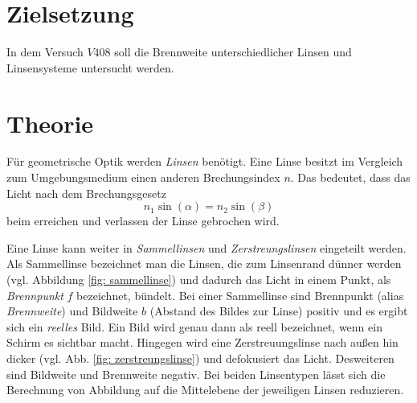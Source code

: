 \setcounter{page}{1}
\section*{Zielsetzung}
In dem Versuch $V408$ soll die Brennweite unterschiedlicher Linsen und
Linsensysteme untersucht werden.
\section{Theorie}
Für geometrische Optik werden \emph{Linsen} benötigt.
Eine Linse besitzt im Vergleich zum Umgebungsmedium einen anderen Brechungsindex $n$.
Das bedeutet, dass das Licht nach dem Brechungsgesetz
\begin{equation*}
  n_1\sin(\alpha)=n_2\sin(\beta)
\end{equation*}
beim erreichen und verlassen der Linse gebrochen wird.

Eine Linse kann weiter in \emph{Sammellinsen} und \emph{Zerstreungslinsen}
eingeteilt werden. Als Sammellinse bezeichnet man die Linsen, die zum Linsenrand
dünner werden (vgl. Abbildung \ref{fig: sammellinse}) und dadurch das Licht in einem Punkt, als \emph{Brennpunkt} $f$ bezeichnet,
bündelt.
Bei einer Sammellinse sind Brennpunkt (alias \emph{Brennweite})
und Bildweite $b$ (Abstand des Bildes zur Linse) positiv und es ergibt sich ein
\emph{reelles} Bild. Ein Bild wird genau dann als reell bezeichnet, wenn
ein Schirm es sichtbar macht.
Hingegen wird eine Zerstreuungslinse nach außen hin dicker (vgl. Abb. \ref{fig: zerstreungslinse}) und
defokusiert das Licht. Desweiteren sind Bildweite und Brennweite negativ.
Bei beiden Linsentypen lässt sich die Berechnung von Abbildung auf die Mittelebene
der jeweiligen Linsen reduzieren.

